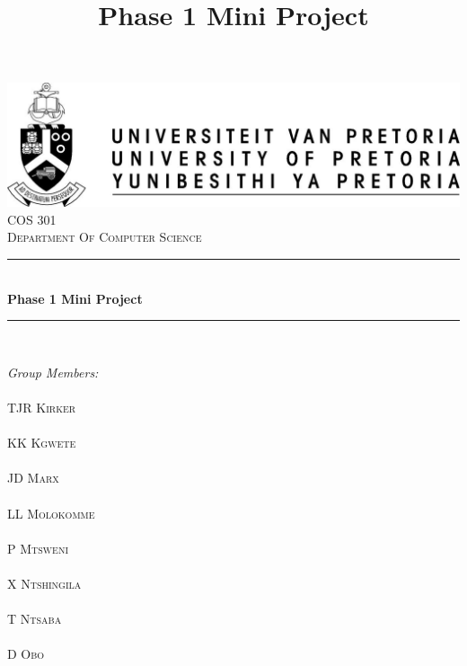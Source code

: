 \documentclass[a4paper,12pt]{report}
\title{Phase 1 Mini Project}
\newcommand{\HRule}{\rule{\linewidth}{0.5mm}}
\begin{document}
\setlength{\parskip}{6pt}



\begin{titlepage}
\begin{center}


\includegraphics[width=1\textwidth]{./up-logo.jpg}\\[0.4cm]  
\textsc{\LARGE COS 301}\\[1.5cm]
\textsc{\LARGE Department Of Computer Science}\\[0.3cm]


\HRule \\[0.4cm]
{ \huge \bfseries Phase 1 Mini Project}\\[0.1cm]
\HRule \\[0.4cm]


\begin{minipage}{0.4\textwidth}
\begin{flushleft} \large

\emph{Group Members:}\\
\emph{}\\
TJR \textsc{Kirker}
\emph{}\\
\emph{}\\
KK \textsc{Kgwete}
\emph{}\\
\emph{}\\
JD \textsc{Marx}
\emph{}\\
\emph{}\\
LL \textsc{Molokomme}
\emph{}\\
\emph{}\\
P \textsc{Mtsweni}
\emph{}\\
\emph{}\\
X \textsc{Ntshingila}
\emph{}\\
\emph{}\\
T \textsc{Ntsaba}
\emph{}\\
\emph{}\\
D \textsc{Obo}

\end{flushleft}
\end{minipage}
\begin{minipage}{0.4\textwidth}
\begin{flushright} \large


\end{flushright}
\end{minipage}
\end{center}
\end{titlepage}
\end{document}
